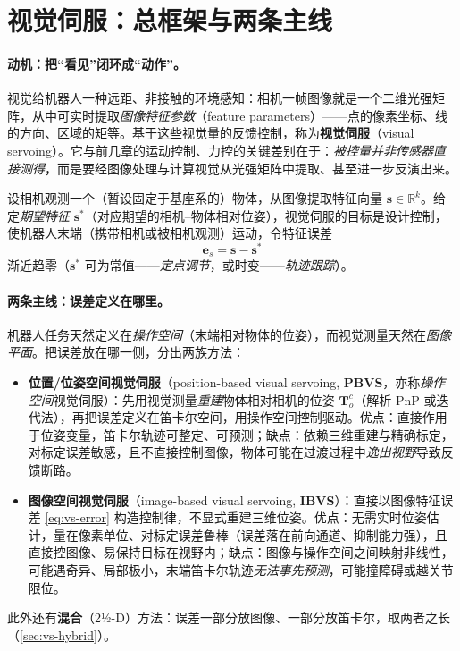 \section{视觉伺服：总框架与两条主线}
\label{sec:vs-overview}

\paragraph{动机：把“看见”闭环成“动作”。}
视觉给机器人一种远距、非接触的环境感知：相机一帧图像就是一个二维光强矩阵，从中可实时提取\emph{图像特征参数}（feature parameters）——点的像素坐标、线的方向、区域的矩等。基于这些视觉量的反馈控制，称为\textbf{视觉伺服}（visual servoing）\cite{hutchinson1996tutorial,chaumette2006visual}。它与前几章的运动控制、力控的关键差别在于：\emph{被控量并非传感器直接测得}，而是要经图像处理与计算视觉从光强矩阵中提取、甚至进一步反演出来\cite{siciliano2009robotics}。

\begin{definition}[视觉伺服问题]\label{def:vs-problem}
设相机观测一个（暂设固定于基座系的）物体，从图像提取特征向量 $\mathbf{s}\in\mathbb{R}^k$。给定\emph{期望特征} $\mathbf{s}^\ast$（对应期望的相机--物体相对位姿），视觉伺服的目标是设计控制，使机器人末端（携带相机或被相机观测）运动，令特征误差
\begin{equation}
  \mathbf{e}_s=\mathbf{s}-\mathbf{s}^\ast
  \label{eq:vs-error}
\end{equation}
渐近趋零（$\mathbf{s}^\ast$ 可为常值——\emph{定点调节}，或时变——\emph{轨迹跟踪}）。
\end{definition}

\paragraph{两条主线：误差定义在哪里。}
机器人任务天然定义在\emph{操作空间}（末端相对物体的位姿），而视觉测量天然在\emph{图像平面}。把误差放在哪一侧，分出两族方法\cite{siciliano2009robotics,hutchinson1996tutorial}：

\begin{itemize}
  \item \textbf{位置/位姿空间视觉伺服}（position-based visual servoing, \textbf{PBVS}，亦称\emph{操作空间}视觉伺服）：先用视觉测量\emph{重建}物体相对相机的位姿 $\mathbf{T}_o^c$（解析 PnP 或迭代法），再把误差定义在笛卡尔空间，用操作空间控制驱动。优点：直接作用于位姿变量，笛卡尔轨迹可整定、可预测；缺点：依赖三维重建与精确标定，对标定误差敏感，且不直接控制图像，物体可能在过渡过程中\emph{逸出视野}导致反馈断路。
  \item \textbf{图像空间视觉伺服}（image-based visual servoing, \textbf{IBVS}）：直接以图像特征误差 \cref{eq:vs-error} 构造控制律，不显式重建三维位姿。优点：无需实时位姿估计，量在像素单位、对标定误差鲁棒（误差落在前向通道、抑制能力强），且直接控图像、易保持目标在视野内；缺点：图像与操作空间之间映射非线性，可能遇奇异、局部极小，末端笛卡尔轨迹\emph{无法事先预测}，可能撞障碍或越关节限位。
\end{itemize}
此外还有\textbf{混合}（2½-D）方法：误差一部分放图像、一部分放笛卡尔，取两者之长（\cref{sec:vs-hybrid}）。

